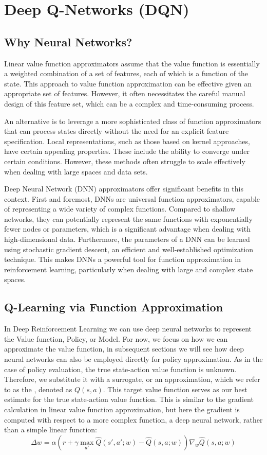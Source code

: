 \section{Deep Q-Networks (DQN)}

\subsection{Why Neural Networks?}
Linear value function approximators assume that the value function is essentially a weighted combination of a set of features, each of which is a function of the state. This approach to value function approximation can be effective given an appropriate set of features. However, it often necessitates the careful manual design of this feature set, which can be a complex and time-consuming process.

An alternative is to leverage a more sophisticated class of function approximators that can process states directly without the need for an explicit feature specification. Local representations, such as those based on kernel approaches, have certain appealing properties. These include the ability to converge under certain conditions. However, these methods often struggle to scale effectively when dealing with large spaces and data sets.

Deep Neural Network (DNN) approximators offer significant benefits in this context. First and foremost, DNNs are universal function approximators, capable of representing a wide variety of complex functions. Compared to shallow networks, they can potentially represent the same functions with exponentially fewer nodes or parameters, which is a significant advantage when dealing with high-dimensional data. Furthermore, the parameters of a DNN can be learned using stochastic gradient descent, an efficient and well-established optimization technique. This makes DNNs a powerful tool for function approximation in reinforcement learning, particularly when dealing with large and complex state spaces.



\subsection{Q-Learning via Function  Approximation}
In Deep Reinforcement Learning we can use deep neural networks to represent the Value function, Policy, or Model. 
For now, we focus on how we can approximate the value function, in subsequent sections we will see how deep neural networks can also be employed directly for policy approximation. 
As in the case of policy evaluation, the true state-action value function is unknown. Therefore, we substitute it with a surrogate, or an approximation, which we refer to as the , denoted as $Q(s,a)$. This target value function serves as our best estimate for the true state-action value function.
This is similar to the gradient calculation in linear value function approximation, but here the gradient is computed with respect to a more complex function, a deep neural network, rather than a simple linear function:
    $$
    \Delta w = \alpha \left(r + \gamma \max_{a'} \hat{Q}(s', a'; w) - \hat{Q}(s, a; w)\right) \nabla_w \hat{Q}(s, a; w)
    $$

